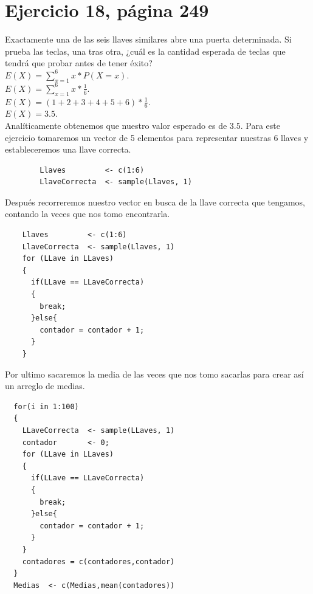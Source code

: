 \documentclass[]{article}
\begin{document}
    
\section{Ejercicio 18, página 249}


Exactamente una de las seis llaves similares abre una puerta determinada. Si prueba las teclas, una tras otra, ¿cuál es la cantidad esperada de teclas que tendrá que probar antes de tener éxito?\\
$E(X) = \sum_{x = 1}^{6} x * P(X = x)$.\\
$E(X) = \sum_{x = 1}^{6} x * \frac{1}{6}$.\\
$E(X) = (1+2+3+4+5+6)* \frac{1}{6}$.\\
$E(X) = 3.5$.\\
Analíticamente obtenemos que nuestro valor esperado es de $3.5$.
Para este ejercicio tomaremos un vector de 5 elementos para representar nuestras 6 llaves y estableceremos una llave correcta.
      \begin{lstlisting}
		Llaves         <- c(1:6)
		LlaveCorrecta  <- sample(Llaves, 1)

      \end{lstlisting}
Después recorreremos nuestro vector en busca de la llave correcta que tengamos, contando la veces que nos tomo encontrarla.
      \begin{lstlisting}
	Llaves         <- c(1:6)
	LlaveCorrecta  <- sample(Llaves, 1)
    for (LLave in LLaves) 
    {
      if(LLave == LLaveCorrecta)
      {
        break;
      }else{
        contador = contador + 1;
      }
    }
      \end{lstlisting}
Por ultimo sacaremos la media de las veces que nos tomo sacarlas para crear así un arreglo de medias.
           \begin{lstlisting}
  for(i in 1:100)
  {
    LLaveCorrecta  <- sample(LLaves, 1)
    contador       <- 0;
    for (LLave in LLaves) 
    {
      if(LLave == LLaveCorrecta)
      {
        break;
      }else{
        contador = contador + 1;
      }
    }
    contadores = c(contadores,contador)
  }
  Medias  <- c(Medias,mean(contadores))
      \end{lstlisting}
      
\end{document}
